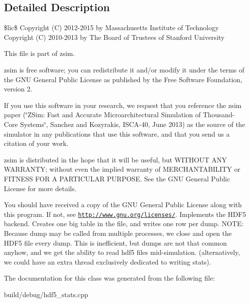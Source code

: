 \subsection{Detailed Description}
\$lic\$ Copyright (C) 2012-\/2015 by Massachusetts Institute of Technology Copyright (C) 2010-\/2013 by The Board of Trustees of Stanford University

This file is part of zsim.

zsim is free software; you can redistribute it and/or modify it under the terms of the G\-N\-U General Public License as published by the Free Software Foundation, version 2.

If you use this software in your research, we request that you reference the zsim paper (\char`\"{}\-Z\-Sim\-: Fast and Accurate Microarchitectural Simulation of
\-Thousand-\/\-Core Systems\char`\"{}, Sanchez and Kozyrakis, I\-S\-C\-A-\/40, June 2013) as the source of the simulator in any publications that use this software, and that you send us a citation of your work.

zsim is distributed in the hope that it will be useful, but W\-I\-T\-H\-O\-U\-T A\-N\-Y W\-A\-R\-R\-A\-N\-T\-Y; without even the implied warranty of M\-E\-R\-C\-H\-A\-N\-T\-A\-B\-I\-L\-I\-T\-Y or F\-I\-T\-N\-E\-S\-S F\-O\-R A P\-A\-R\-T\-I\-C\-U\-L\-A\-R P\-U\-R\-P\-O\-S\-E. See the G\-N\-U General Public License for more details.

You should have received a copy of the G\-N\-U General Public License along with this program. If not, see \href{http://www.gnu.org/licenses/}{\tt http\-://www.\-gnu.\-org/licenses/}. Implements the H\-D\-F5 backend. Creates one big table in the file, and writes one row per dump. N\-O\-T\-E\-: Because dump may be called from multiple processes, we close and open the H\-D\-F5 file every dump. This is inefficient, but dumps are not that common anyhow, and we get the ability to read hdf5 files mid-\/simulation. (alternatively, we could have an extra thread exclusively dedicated to writing stats). 

The documentation for this class was generated from the following file\-:\begin{DoxyCompactItemize}
\item 
build/debug/hdf5\-\_\-stats.\-cpp\end{DoxyCompactItemize}
